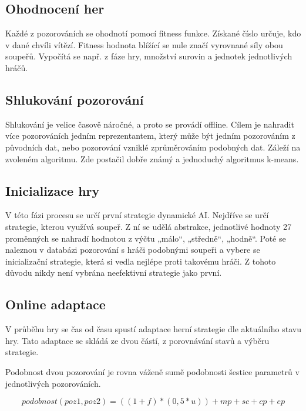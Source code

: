 \subsection{Ohodnocení her}

Každé z pozorováních se ohodnotí pomocí fitness funkce. Získané číslo určuje, kdo v dané chvíli vítězí. Fitness hodnota blížící se nule značí vyrovnané síly obou soupeřů. Vypočítá se např. z fáze hry, množství surovin a jednotek jednotlivých hráčů.

\subsection{Shlukování pozorování}

Shlukování je velice časově náročné, a proto se provádí offline. Cílem je nahradit více pozorováních jedním reprezentantem, který může být jedním pozorováním z původních dat, nebo pozorování vzniklé zprůměrováním podobných dat. Záleží na zvoleném algoritmu. Zde postačil dobře známý a jednoduchý algoritmus k-means\cite{kmeans}.

\subsection{Inicializace hry}

V této fázi procesu se určí první strategie dynamické AI. Nejdříve se určí strategie, kterou využívá soupeř. Z ní se udělá abstrakce, jednotlivé hodnoty 27 proměnných se nahradí hodnotou z výčtu „málo“, „středně“, „hodně“.  Poté se naleznou v databázi pozorování s hráči podobnými soupeři a vybere se inicializační strategie, která si vedla nejlépe proti takovému hráči. Z tohoto důvodu nikdy není vybrána neefektivní strategie jako první.

\subsection{Online adaptace}

V průběhu hry se čas od času spustí adaptace herní strategie dle aktuálního stavu hry. Tato adaptace se skládá ze dvou částí, z porovnávání stavů a výběru strategie.

Podobnost dvou pozorování je rovna váženě sumě podobnosti šestice parametrů v jednotlivých pozorováních.

\begin{equation}
	   podobnost(poz1,poz2)=((1+f)*(0,5*u)) + mp + sc + cp + ep
\end{equation}


